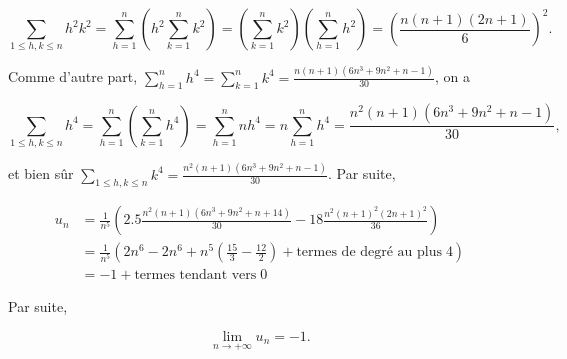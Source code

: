 {\begin{enumerate}
{$$\sum_{1\leq h,k\leq
n}^{}h^2k^2=\sum_{h=1}^{n}(h^2\sum_{k=1}^{n}k^2)=(\sum_{k=1}^{n}k^2)(\sum_{h=1}^{n}h^2)=\left(\frac{n(n+1)(2n+1)}{6}\right)^
2.$$

Comme d'autre part, $\sum_{h=1}^{n}h^4=\sum_{k=1}^{n}k^4=\frac{n(n+1)(6n^3+9n^2+n-1)}{30}$, on a

$$\sum_{1\leq h,k\leq
n}^{}h^4=\sum_{h=1}^{n}(\sum_{k=1}^{n}h^4)=\sum_{h=1}^{n}nh^4=n\sum_{h=1}^{n}h^4=\frac{n^2(n+1)(6n^3+9n^2+n-1)}{30},$$

et bien sûr $\sum_{1\leq h,k\leq
n}^{}k^4=\frac{n^2(n+1)(6n^3+9n^2+n-1)}{30}$. Par suite,

\begin{align*}
u_n&=\frac{1}{n^5}\left(2.5\frac{n^2(n+1)(6n^3+9n^2+n+14)}{30}-18\frac{n^2(n+1)^2(2n+1)^2}{36}\right)\\
 &=\frac{1}{n^5}(2n^6-2n^6+n^5(\frac{15}{3}-\frac{12}{2})+\mbox{termes de degré au plus}\;4)\\
 &=-1+\mbox{termes tendant vers}\;0
\end{align*}

Par suite,

$$\lim_{n\rightarrow +\infty}u_n=-1.$$}
\end{enumerate}
}
